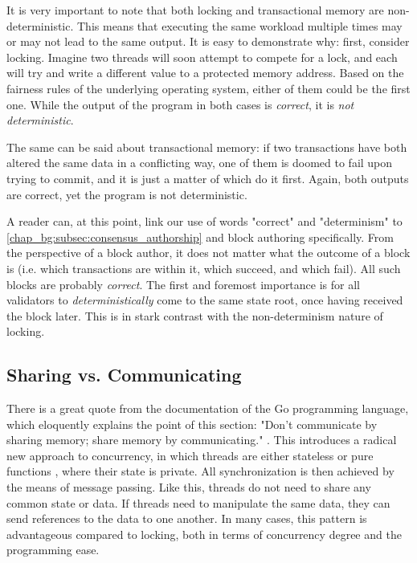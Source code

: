 It is very important to note that both locking and transactional memory are non-deterministic. This
means that executing the same workload multiple times may or may not lead to the same output. It is
easy to demonstrate why: first, consider locking. Imagine two threads will soon attempt to compete
for a lock, and each will try and write a different value to a protected memory address. Based on
the fairness rules of the underlying operating system, either of them could be the first one. While
the output of the program in both cases is \textit{correct}, it is \textit{not deterministic}.

The same can be said about transactional memory: if two transactions have both altered the same data
in a conflicting way, one of them is doomed to fail upon trying to commit, and it is just a matter
of which do it first. Again, both outputs are correct, yet the program is not deterministic.

\begin{remark}
	A reader can, at this point, link our use of words "correct" and "determinism" to
	\ref{chap_bg:subsec:consensus_authorship} and block authoring specifically. From the perspective
	of a block author, it does not matter what the outcome of a block is (i.e. which transactions
	are within it, which succeed, and which fail). All such blocks are probably \textit{correct}.
	The first and foremost importance is for all validators to \textit{deterministically} come to
	the same state root, once having received the block later. This is in stark contrast with the
	non-determinism nature of locking.
\end{remark}


\subsection{Sharing vs. Communicating}\label{chap_bg:subsec:sharing_communication}

There is a great quote from the documentation of the Go programming language, which eloquently
explains the point of this section: "Don't communicate by sharing memory; share memory by
communicating." \cite{ShareMemoryCommunicating}. This introduces a radical new approach to
concurrency, in which threads are either stateless or pure functions
\cite{MostlyAdequateMostlyadequateguide}, where their state is private. All synchronization is then
achieved by the means of message passing. Like this, threads do not need to share any common state
or data. If threads need to manipulate the same data, they can send references to the data to one
another. In many cases, this pattern is advantageous compared to locking, both in terms of
concurrency degree and the programming ease.

